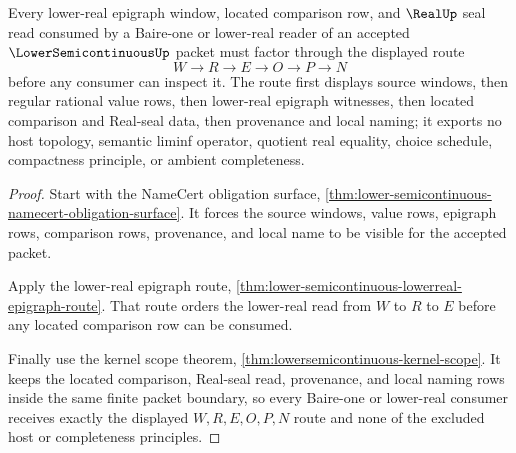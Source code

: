 \begin{theorem}
\label{thm:lowersemicontinuous-root-obligation-split}
Every lower-real epigraph window, located comparison row, and $\RealUp$ seal read consumed by a Baire-one or lower-real reader of an accepted $\LowerSemicontinuousUp$ packet must factor through the displayed route
$$
W \longrightarrow R \longrightarrow E \longrightarrow O \longrightarrow P \longrightarrow N
$$
before any consumer can inspect it. The route first displays source windows, then regular rational value rows, then lower-real epigraph witnesses, then located comparison and Real-seal data, then provenance and local naming; it exports no host topology, semantic liminf operator, quotient real equality, choice schedule, compactness principle, or ambient completeness.
\end{theorem}
\begin{proof}
Start with the NameCert obligation surface, \autoref{thm:lower-semicontinuous-namecert-obligation-surface}. It forces the source windows, value rows, epigraph rows, comparison rows, provenance, and local name to be visible for the accepted packet.

Apply the lower-real epigraph route, \autoref{thm:lower-semicontinuous-lowerreal-epigraph-route}. That route orders the lower-real read from $W$ to $R$ to $E$ before any located comparison row can be consumed.

Finally use the kernel scope theorem, \autoref{thm:lowersemicontinuous-kernel-scope}. It keeps the located comparison, Real-seal read, provenance, and local naming rows inside the same finite packet boundary, so every Baire-one or lower-real consumer receives exactly the displayed $W,R,E,O,P,N$ route and none of the excluded host or completeness principles.
\end{proof}

